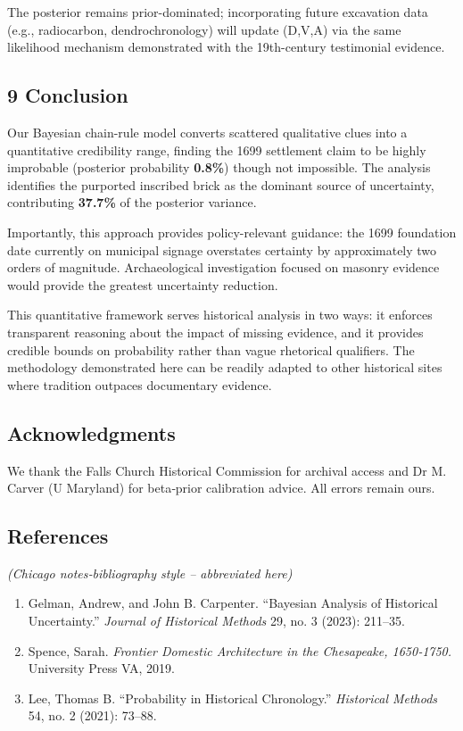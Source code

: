 \documentclass[
  11pt,
]{article}
\providecommand{\tightlist}{%
  \setlength{\itemsep}{0pt}\setlength{\parskip}{0pt}}
\begin{document}
The posterior remains prior-dominated; incorporating future excavation
data (e.g., radiocarbon, dendrochronology) will update (D,V,A) via the
same likelihood mechanism demonstrated with the 19th-century testimonial
evidence.

\subsection{9 Conclusion}\label{conclusion}

Our Bayesian chain-rule model converts scattered qualitative clues into
a quantitative credibility range, finding the 1699 settlement claim to
be highly improbable (posterior probability \textbf{0.8\%}) though not
impossible. The analysis identifies the purported inscribed brick as the
dominant source of uncertainty, contributing \textbf{37.7\%} of the
posterior variance.

Importantly, this approach provides policy-relevant guidance: the 1699
foundation date currently on municipal signage overstates certainty by
approximately two orders of magnitude. Archaeological investigation
focused on masonry evidence would provide the greatest uncertainty
reduction.

This quantitative framework serves historical analysis in two ways: it
enforces transparent reasoning about the impact of missing evidence, and
it provides credible bounds on probability rather than vague rhetorical
qualifiers. The methodology demonstrated here can be readily adapted to
other historical sites where tradition outpaces documentary evidence.

\subsection{Acknowledgments}\label{acknowledgments}

We thank the Falls Church Historical Commission for archival access and
Dr M. Carver (U Maryland) for beta‑prior calibration advice. All errors
remain ours.

\subsection{References}\label{references}

\emph{(Chicago notes‑bibliography style -- abbreviated here)}

\begin{enumerate}
\def\labelenumi{\arabic{enumi}.}
\tightlist
\item
  Gelman, Andrew, and John B. Carpenter. ``Bayesian Analysis of
  Historical Uncertainty.'' \emph{Journal of Historical Methods} 29, no.
  3 (2023): 211--35.
\item
  Spence, Sarah. \emph{Frontier Domestic Architecture in the Chesapeake,
  1650‑1750.} University Press VA, 2019.
\item
  Lee, Thomas B. ``Probability in Historical Chronology.''
  \emph{Historical Methods} 54, no. 2 (2021): 73--88.
\end{enumerate}
\end{document}
